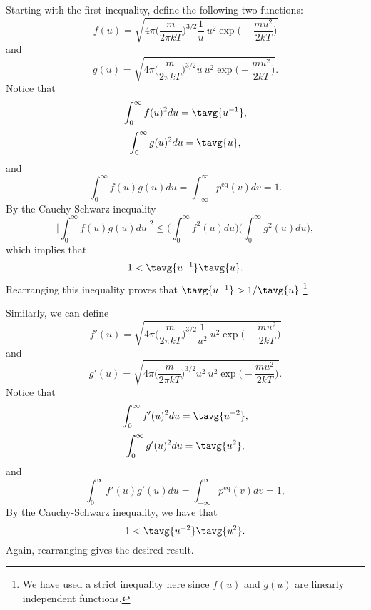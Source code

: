 Starting with the first inequality, define the following two functions:
\begin{equation}
f(u) = \sqrt{4\pi \bigg( \frac{m}{2\pi k T}\bigg)^{3/2} \frac{1}{u}~u^2 \exp\bigg(-\frac{m u^2}{2 k T}\bigg) } \nonumber
\end{equation}
and
\begin{equation}
g(u) = \sqrt{4\pi \bigg( \frac{m}{2\pi k T}\bigg)^{3/2} u ~u^2 \exp\bigg(-\frac{m u^2}{2 k T}\bigg) }. \nonumber
\end{equation}
Notice that
\begin{equation}
\int_{0}^{\infty} f(u)^2 du = \tavg{u^{-1}}, \nonumber
\end{equation}
\begin{equation}
\int_{0}^{\infty} g(u)^2 du  = \tavg{u}, \nonumber
\end{equation}
and
\begin{equation}
\int_{0}^{\infty} f(u)g (u)du  = \int_{-\infty}^{\infty} p^{\text{eq}}(v) dv = 1. \nonumber
\end{equation}
By the Cauchy-Schwarz inequality
\begin{equation}
\bigg|\int_{0}^{\infty} f(u) g(u) du \bigg|^2 \leq \bigg(\int_{0}^{\infty} f^2(u) du \bigg) \bigg(\int_{0}^{\infty} g^2(u) du \bigg),
\end{equation}
which implies that
\begin{equation}
1 < \tavg{u^{-1}} \tavg{u}.
\end{equation}
Rearranging this inequality proves that $\tavg{u^{-1}} > 1/\tavg{u}$ \footnote{We have used a strict inequality here since $f(u)$ and $g(u)$ are linearly independent functions.}

Similarly, we can define 
\begin{equation}
f'(u) = \sqrt{4\pi \bigg( \frac{m}{2\pi k T}\bigg)^{3/2} \frac{1}{u^2}~u^2 \exp\bigg(-\frac{m u^2}{2 k T}\bigg) }
\end{equation}
and
\begin{equation}
g'(u) = \sqrt{4\pi \bigg( \frac{m}{2\pi k T}\bigg)^{3/2} u^2 ~u^2 \exp\bigg(-\frac{m u^2}{2 k T}\bigg) }.
\end{equation}
Notice that
\begin{equation}
\int_{0}^{\infty} f'(u)^2 du = \tavg{u^{-2}},
\end{equation}
\begin{equation}
\int_{0}^{\infty} g'(u)^2 du  = \tavg{u^2},
\end{equation}
and
\begin{equation}
\int_{0}^{\infty} f'(u)g'(u)du  = \int_{-\infty}^{\infty} p^{\text{eq}}(v) dv = 1,
\end{equation}
By the Cauchy-Schwarz inequality, we have that
\begin{equation}
1 < \tavg{u^{-2}} \tavg{u^2}.
\end{equation}
Again, rearranging gives the desired result.

